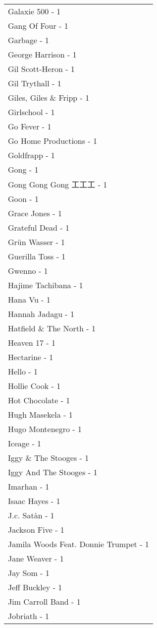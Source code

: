 \documentclass[
]{article}
\begin{document}
\begin{longtable}{l}
Galaxie 500 - 1 \\ 
Gang Of Four - 1 \\ 
Garbage - 1 \\ 
George Harrison - 1 \\ 
Gil Scott-Heron - 1 \\ 
Gil Trythall - 1 \\ 
Giles, Giles \& Fripp - 1 \\ 
Girlschool - 1 \\ 
Go Fever - 1 \\ 
Go Home Productions - 1 \\ 
Goldfrapp - 1 \\ 
Gong - 1 \\ 
Gong Gong Gong 工工工 - 1 \\ 
Goon - 1 \\ 
Grace Jones - 1 \\ 
Grateful Dead - 1 \\ 
Grün Wasser - 1 \\ 
Guerilla Toss - 1 \\ 
Gwenno - 1 \\ 
Hajime Tachibana - 1 \\ 
Hana Vu - 1 \\ 
Hannah Jadagu - 1 \\ 
Hatfield \& The North - 1 \\ 
Heaven 17 - 1 \\ 
Hectarine - 1 \\ 
Hello - 1 \\ 
Hollie Cook - 1 \\ 
Hot Chocolate - 1 \\ 
Hugh Masekela - 1 \\ 
Hugo Montenegro - 1 \\ 
Iceage - 1 \\ 
Iggy \& The Stooges - 1 \\ 
Iggy And The Stooges - 1 \\ 
Imarhan - 1 \\ 
Isaac Hayes - 1 \\ 
J.c. Satàn - 1 \\ 
Jackson Five - 1 \\ 
Jamila Woods Feat. Donnie Trumpet - 1 \\ 
Jane Weaver - 1 \\ 
Jay Som - 1 \\ 
Jeff Buckley - 1 \\ 
Jim Carroll Band - 1 \\ 
Jobriath - 1 \\ 

\end{longtable}
\end{document}
